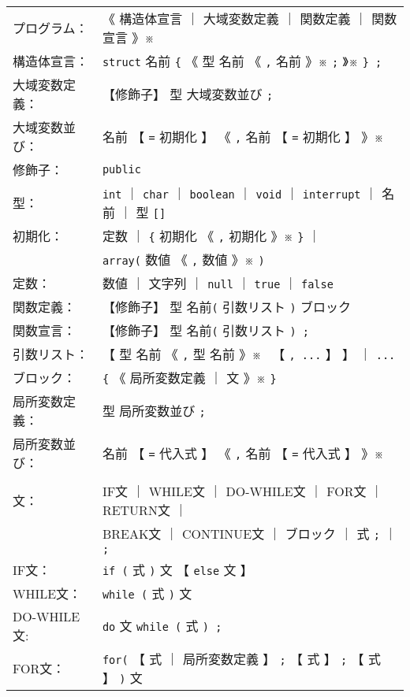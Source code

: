 \begin{mylist}
{{\footnotesize\tt
\begin{tabular}{l l}
プログラム：  & 《 構造体宣言 ｜ 大域変数定義 ｜ 関数定義 ｜ 関数宣言 》※ \\
構造体宣言：  & \verb+struct+ 名前 \verb+{+
                《 型 名前 《 \verb+,+ 名前 》※ \verb+;+ 》※ \verb+} ;+ \\
大域変数定義：& 【修飾子】 型 大域変数並び \verb+;+ \\
大域変数並び：& 名前 【 \verb+=+ 初期化 】
                《 \verb+,+ 名前 【 \verb+=+ 初期化 】 》※ \\
修飾子：      & \verb+public+ \\
型：          & \verb+int+  ｜ \verb+char+ ｜ \verb+boolean+ ｜
                \verb+void+ ｜ \verb+interrupt+ ｜ 名前 ｜ 型 \verb+[]+ \\
初期化：      & 定数 ｜ \verb+{+ 初期化 《 \verb+,+ 初期化 》※ \verb+}+ ｜\\
              & \verb+array(+ 数値 《 \verb+,+ 数値 》※ \verb+)+\\
定数：        & 数値 ｜ 文字列 ｜ \verb+null+ ｜ \verb+true+ ｜
                \verb+false+ \\
関数定義：    & 【修飾子】 型 名前\verb+(+ 引数リスト \verb+)+ ブロック \\
関数宣言：    & 【修飾子】 型 名前\verb+(+ 引数リスト \verb+) ;+ \\
引数リスト：  & 【 型 名前 《 \verb+,+ 型 名前 》※~
                【 \verb+, ...+ 】 】 ｜ \verb+...+ \\
ブロック：    & \verb+{+ 《 局所変数定義 ｜ 文 》※ \verb+}+ \\
局所変数定義：& 型 局所変数並び \verb+;+ \\
局所変数並び：& 名前 【 \verb+=+ 代入式 】
                《 \verb+,+ 名前 【 \verb+=+ 代入式 】 》※ \\
              & \\
文：          & IF文 ｜ WHILE文 ｜ DO-WHILE文 ｜ FOR文 ｜ RETURN文 ｜ \\
              & BREAK文 ｜ CONTINUE文 ｜ ブロック ｜ 式 \verb+;+ ｜ \verb+;+\\
IF文：        & \verb+if (+ 式 \verb+)+ 文  【 \verb+else+ 文  】 \\
WHILE文：     & \verb+while (+ 式 \verb+)+ 文 \\
DO-WHILE文:   & \verb+do+ 文 \verb+while (+ 式 \verb+) ;+ \\
FOR文：       & \verb+for(+ 【 式 ｜ 局所変数定義 】 \verb+;+
               【 式 】 \verb+;+ 【 式 】 \verb+)+ 文 \\

\end{tabular}}}
\end{mylist}
